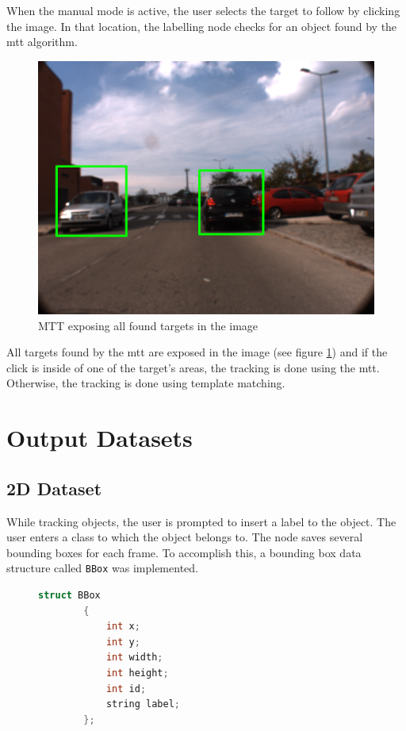 When the manual mode is active, the user selects the target to follow by clicking the image. In that location, the labelling node checks for an object found by the \gls{mtt} algorithm. 

\begin{figure}[h]
	
	\centering
	\includegraphics[width=.6\textwidth]{caplabel/imgs/mtt_proj.png}
	
	\caption{MTT exposing all found targets in the image}
	\label{fig:mtt_proj}
	
\end{figure}

All targets found by the \gls{mtt} are exposed in the image (see figure \ref{fig:mtt_proj}) and if the click is inside of one of the target's areas, the tracking is done using the \gls{mtt}. Otherwise, the tracking is done using template matching.

\section{Output Datasets}

\subsection{2D Dataset}

While tracking objects, the user is prompted to insert a label to the object. The user enters a class to which the object belongs to. The node saves several bounding boxes for each frame. To accomplish this, a bounding box data structure called \texttt{BBox} was implemented.

\begin{figure}
	\begin{center}
		\begin{lstlisting}[label={lst:BBox2ddef}, caption={BBox struct definition used for 2D datasets.},language=c++]
		struct BBox
		{
			int x;
			int y;
			int width;
			int height;
			int id;
			string label;
		};\end{lstlisting}
	\end{center}
\end{figure}

